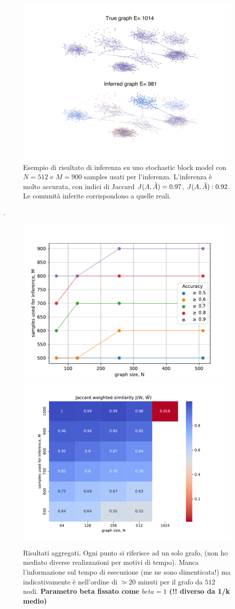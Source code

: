 \documentclass{article}
\begin{document}
\begin{figure}[H]
    \centering
    \includegraphics[width=\linewidth]{images/visualization.pdf}
    \caption{Esempio di risultato di inferenza su uno stochastic block model con $N = 512$ e $M = 900$ samples usati per l'inferenza. L'inferenza è molto accurata, con indici di Jaccard $J(A, \Tilde{A}) =0.97$, $J(A, \Tilde{A}): 0.92$. Le comunità inferite corrispondono a quelle reali.}
\end{figure}.
\begin{figure}[H]
    \centering
    \includegraphics[width=0.45\linewidth]{images/plain_sbm_ising.pdf}
    \includegraphics[width=0.45\linewidth]{images/sbm_ising_heatmap.pdf}
    \caption{Risultati aggregati. Ogni punto si riferisce ad un solo grafo, (non ho mediato diverse realizzazioni per motivi di tempo). Manca l'informazione sul tempo di esecuzione (me ne sono dimenticata!) ma indicativamente è nell'ordine di  $\simeq 20$ minuti per il grafo da $512$ nodi. \textbf{Parametro beta fissato come $beta = 1$ (!! diverso da 1/k medio)}}
    \label{fig:enter-label}
\end{figure}
\end{document}
